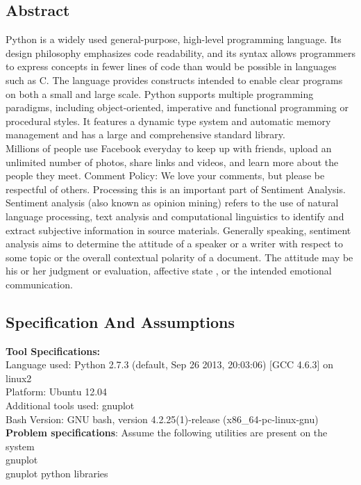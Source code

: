 \documentclass[paper=a4, fontsize=11pt]{scrartcl} %
\numberwithin{equation}{section} %
\numberwithin{figure}{section} %
\numberwithin{table}{section} %
\begin{document}
\subsection{Abstract}

Python is a widely used general-purpose, high-level programming language. Its design philosophy emphasizes code readability, and its syntax allows programmers to express concepts in fewer lines of code than would be possible in languages such as C. The language provides constructs intended to enable clear programs on both a small and large scale.
Python supports multiple programming paradigms, including object-oriented, imperative and functional programming or procedural styles. It features a dynamic type system and automatic memory management and has a large and comprehensive standard library.\\

Millions of people use Facebook everyday to keep up with friends, upload an unlimited number of photos, share links and videos, and learn more about the people they meet. Comment Policy: We love your comments, but please be respectful of others. Processing this is an important part of Sentiment Analysis.\\

Sentiment analysis (also known as opinion mining) refers to the use of natural language processing, text analysis and computational linguistics to identify and extract subjective information in source materials. Generally speaking, sentiment analysis aims to determine the attitude of a speaker or a writer with respect to some topic or the overall contextual polarity of a document. The attitude may be his or her judgment or evaluation, affective state , or the intended emotional communication.\\


\subsection{Specification And Assumptions}
{\textbf {Tool Specifications:}}\\
Language used: Python 2.7.3 (default, Sep 26 2013, 20:03:06)  [GCC 4.6.3] on linux2\\
Platform: Ubuntu 12.04\\
Additional tools used: gnuplot\\
Bash Version: GNU bash, version 4.2.25(1)-release (x86\_64-pc-linux-gnu)\\

\textbf{Problem specifications}:
Assume the following utilities are present on the system\\
gnuplot\\
gnuplot python libraries\\
\end{document}
